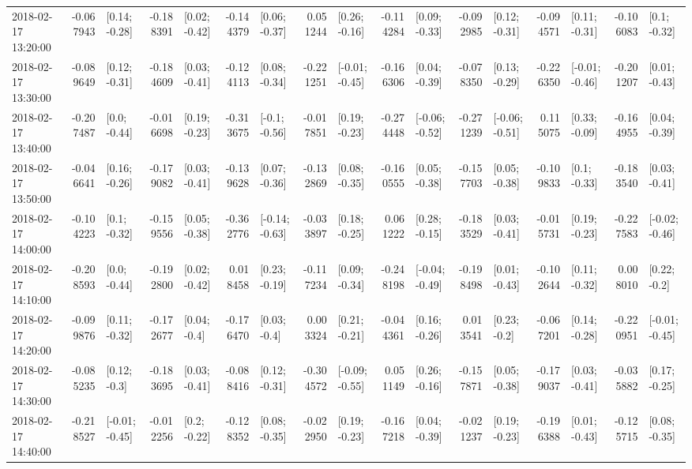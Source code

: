 \begin{tabular}{lrlrlrlrlrlrlrlrl}
2018-02-17 13:20:00 & -0.067943 &   [0.14; -0.28] & -0.188391 &   [0.02; -0.42] & -0.144379 &   [0.06; -0.37] &  0.051244 &   [0.26; -0.16] & -0.114284 &   [0.09; -0.33] & -0.092985 &   [0.12; -0.31] & -0.094571 &   [0.11; -0.31] & -0.106083 &    [0.1; -0.32] \\
2018-02-17 13:30:00 & -0.089649 &   [0.12; -0.31] & -0.184609 &   [0.03; -0.41] & -0.124113 &   [0.08; -0.34] & -0.221251 &  [-0.01; -0.45] & -0.166306 &   [0.04; -0.39] & -0.078350 &   [0.13; -0.29] & -0.226350 &  [-0.01; -0.46] & -0.201207 &   [0.01; -0.43] \\
2018-02-17 13:40:00 & -0.207487 &    [0.0; -0.44] & -0.016698 &   [0.19; -0.23] & -0.313675 &   [-0.1; -0.56] & -0.017851 &   [0.19; -0.23] & -0.274448 &  [-0.06; -0.52] & -0.271239 &  [-0.06; -0.51] &  0.115075 &   [0.33; -0.09] & -0.164955 &   [0.04; -0.39] \\
2018-02-17 13:50:00 & -0.046641 &   [0.16; -0.26] & -0.179082 &   [0.03; -0.41] & -0.139628 &   [0.07; -0.36] & -0.132869 &   [0.08; -0.35] & -0.160555 &   [0.05; -0.38] & -0.157703 &   [0.05; -0.38] & -0.109833 &    [0.1; -0.33] & -0.183540 &   [0.03; -0.41] \\
2018-02-17 14:00:00 & -0.104223 &    [0.1; -0.32] & -0.159556 &   [0.05; -0.38] & -0.362776 &  [-0.14; -0.63] & -0.033897 &   [0.18; -0.25] &  0.061222 &   [0.28; -0.15] & -0.183529 &   [0.03; -0.41] & -0.015731 &   [0.19; -0.23] & -0.227583 &  [-0.02; -0.46] \\
2018-02-17 14:10:00 & -0.208593 &    [0.0; -0.44] & -0.192800 &   [0.02; -0.42] &  0.018458 &   [0.23; -0.19] & -0.117234 &   [0.09; -0.34] & -0.248198 &  [-0.04; -0.49] & -0.198498 &   [0.01; -0.43] & -0.102644 &   [0.11; -0.32] &  0.008010 &    [0.22; -0.2] \\
2018-02-17 14:20:00 & -0.099876 &   [0.11; -0.32] & -0.172677 &    [0.04; -0.4] & -0.176470 &    [0.03; -0.4] &  0.003324 &   [0.21; -0.21] & -0.044361 &   [0.16; -0.26] &  0.013541 &    [0.23; -0.2] & -0.067201 &   [0.14; -0.28] & -0.220951 &  [-0.01; -0.45] \\
2018-02-17 14:30:00 & -0.085235 &    [0.12; -0.3] & -0.183695 &   [0.03; -0.41] & -0.088416 &   [0.12; -0.31] & -0.304572 &  [-0.09; -0.55] &  0.051149 &   [0.26; -0.16] & -0.157871 &   [0.05; -0.38] & -0.179037 &   [0.03; -0.41] & -0.035882 &   [0.17; -0.25] \\
2018-02-17 14:40:00 & -0.218527 &  [-0.01; -0.45] & -0.012256 &    [0.2; -0.22] & -0.128352 &   [0.08; -0.35] & -0.022950 &   [0.19; -0.23] & -0.167218 &   [0.04; -0.39] & -0.021237 &   [0.19; -0.23] & -0.196388 &   [0.01; -0.43] & -0.125715 &   [0.08; -0.35] \\

\end{tabular}
